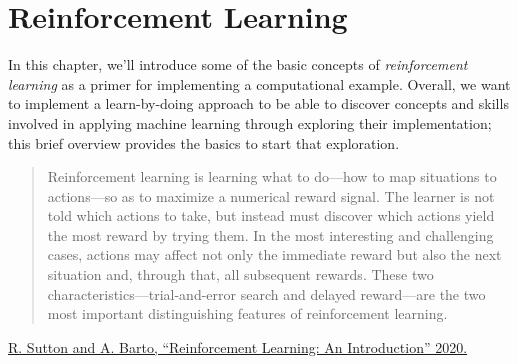 \chapter{Reinforcement Learning}

In this chapter, we'll introduce some of the basic concepts of \emph{reinforcement learning} as a primer for implementing a computational example.  Overall, we want to implement a learn-by-doing approach to be able to discover concepts and skills involved in applying machine learning through exploring their implementation; this brief overview provides the basics to start that exploration.

\begin{quote}
Reinforcement learning is learning what to do---how to map situations to actions---so
as to maximize a numerical reward signal. The learner is not told which actions to
take, but instead must discover which actions yield the most reward by trying them. In
the most interesting and challenging cases, actions may affect not only the immediate
reward but also the next situation and, through that, all subsequent rewards. These two
characteristics—trial-and-error search and delayed reward—are the two most important
distinguishing features of reinforcement learning.
\end{quote}
\href{http://www.incompleteideas.net/book/the-book.html}{R. Sutton and A. Barto, “Reinforcement Learning: An Introduction” 2020.}
